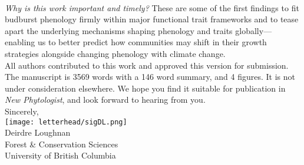 \documentclass[11pt,a4paper]{article}
\begin{document}
\vspace{1.5ex}\\
\emph{Why is this work important and timely?} These are some of the first findings to fit budburst phenology firmly within major functional trait frameworks and to tease apart the underlying mechanisms shaping phenology and traits globally---enabling us to better predict how communities may shift in their growth strategies alongside changing phenology with climate change. 
\vspace{1.5ex}\\
\noindent All authors contributed to this work and approved this version for submission. The manuscript is 3569 words with a 146 word summary, and 4 figures. It is not under consideration elsewhere. We hope you find it suitable for publication in \emph{New Phytologist}, and look forward to hearing from you. 
\vspace{1.5ex}\\
\noindent Sincerely, \\
\texttt{[image: letterhead/sigDL.png]} \\
\noindent Deirdre Loughnan\\
\noindent Forest \& Conservation Sciences\\
\noindent University of British Columbia

\newpage
\end{document}
